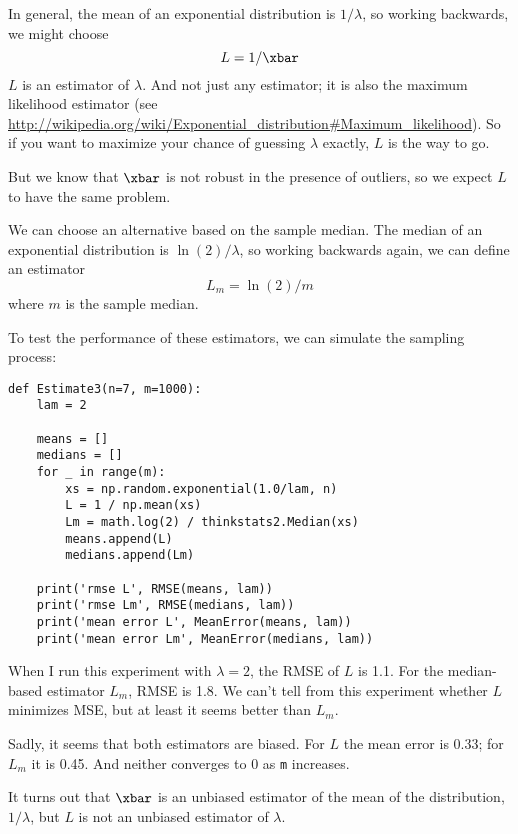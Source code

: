 \newcommand{\lamhat}{L}
\newcommand{\lamhatmed}{L_m}

In general, the mean of an exponential distribution is $1/\lambda$,
so working backwards, we might choose
%
\[ \lamhat = 1 / \xbar\]
%
$\lamhat$ is an
estimator of $\lambda$.  And not just any estimator; it is also the
maximum likelihood estimator (see
\url{http://wikipedia.org/wiki/Exponential_distribution#Maximum_likelihood}).
So if you want to maximize your chance of guessing $\lambda$ exactly,
$\lamhat$ is the way to go.

But we know that $\xbar$ is not robust in the presence of outliers, so
we expect $\lamhat$ to have the same problem.

We can choose an alternative based on the sample median.
The median of an exponential distribution is $\ln(2) / \lambda$,
so working backwards again, we can define an estimator
%
\[ \lamhatmed = \ln(2) / m \]
%
where $m$ is the sample median.

To test the performance of these estimators, we can simulate the
sampling process:

\begin{verbatim}
def Estimate3(n=7, m=1000):
    lam = 2

    means = []
    medians = []
    for _ in range(m):
        xs = np.random.exponential(1.0/lam, n)
        L = 1 / np.mean(xs)
        Lm = math.log(2) / thinkstats2.Median(xs)
        means.append(L)
        medians.append(Lm)

    print('rmse L', RMSE(means, lam))
    print('rmse Lm', RMSE(medians, lam))
    print('mean error L', MeanError(means, lam))
    print('mean error Lm', MeanError(medians, lam))
\end{verbatim}

When I run this experiment with $\lambda=2$, the RMSE of $L$ is
1.1.  For the median-based estimator $L_m$, RMSE is 1.8.  We can't
tell from this experiment whether $L$ minimizes MSE, but at least
it seems better than $L_m$.

Sadly, it seems that both estimators are biased.  For $L$ the mean
error is 0.33; for $L_m$ it is 0.45.  And neither converges to 0
as {\tt m} increases.

It turns out that $\xbar$ is an unbiased estimator of the mean
of the distribution, $1 / \lambda$, but $L$ is not an unbiased
estimator of $\lambda$.


